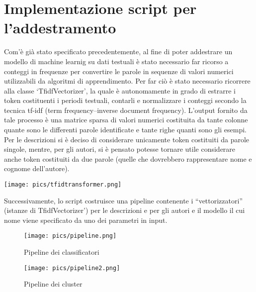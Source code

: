 \documentclass[12pt,oneside]{article}
\begin{document}
\section{Implementazione script per l'addestramento}
    \begin{justify}
        Com’è già stato specificato precedentemente, al fine di poter addestrare un modello di machine learnig su dati testuali è stato necessario far ricorso a conteggi in frequenze per convertire le parole in sequenze di valori numerici utilizzabili da algoritmi di apprendimento. Per far ciò è stato necessario ricorrere alla classe ‘TfidfVectorizer’, la quale è autonomamente in grado di estrarre i token costituenti i periodi testuali, contarli e normalizzare i conteggi secondo la tecnica tf-idf (term frequency–inverse document frequency). L’output fornito  da tale processo è una matrice sparsa di valori numerici costituita da tante colonne quante sono le differenti parole identificate e tante righe quanti sono gli esempi. Per le descrizioni si è deciso di considerare unicamente token costituiti da parole singole, mentre, per gli autori, si è pensato potesse tornare utile considerare anche token costituiti da due parole (quelle che dovrebbero rappresentare nome e cognome dell’autore).
        \end{justify}
        \hfill
        \texttt{[image: pics/tfidtransformer.png]}

        \newpage
        \begin{justify}
        Successivamente, lo script costruisce una pipeline contenente i “vettorizzatori” (istanze di TfidfVectorizer’) per le descrizioni e per gli autori e il modello il cui nome viene specificato da uno dei parametri in input.
        \end{justify}

        \begin{figure}[H]
        \texttt{[image: pics/pipeline.png]}
        \caption{Pipeline dei classificatori}
        \end{figure}

        \begin{figure}[H]
        \texttt{[image: pics/pipeline2.png]}
        \caption{Pipeline dei cluster}
        \end{figure}
        
\end{document}
